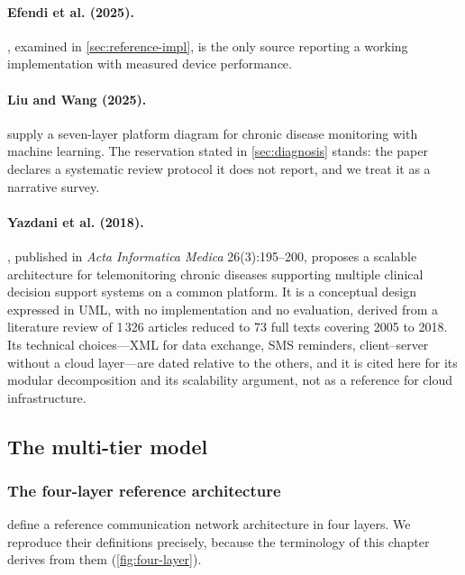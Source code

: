 \documentclass[12pt,a4paper,oneside]{report}
\begin{document}
\paragraph{Efendi et al. (2025).} \textcite{efendi2025}, examined in \cref{sec:reference-impl}, is the only source reporting a working implementation with measured device performance.

\paragraph{Liu and Wang (2025).} \textcite{liu2025review} supply a seven-layer platform diagram for chronic disease monitoring with machine learning. The reservation stated in \cref{sec:diagnosis} stands: the paper declares a systematic review protocol it does not report, and we treat it as a narrative survey.

\paragraph{Yazdani et al. (2018).} \textcite{yazdani2018}, published in \emph{Acta Informatica Medica} 26(3):195--200, proposes a scalable architecture for telemonitoring chronic diseases supporting multiple clinical decision support systems on a common platform. It is a conceptual design expressed in UML, with no implementation and no evaluation, derived from a literature review of 1\,326 articles reduced to 73 full texts covering 2005 to 2018. Its technical choices---XML for data exchange, SMS reminders, client--server without a cloud layer---are dated relative to the others, and it is cited here for its modular decomposition and its scalability argument, not as a reference for cloud infrastructure.

\subsection{The multi-tier model}\label{sec:multitier}

\subsubsection{The four-layer reference architecture}

\Textcite{mucchi2021} define a reference communication network architecture in four layers. We reproduce their definitions precisely, because the terminology of this chapter derives from them (\cref{fig:four-layer}).
\end{document}
